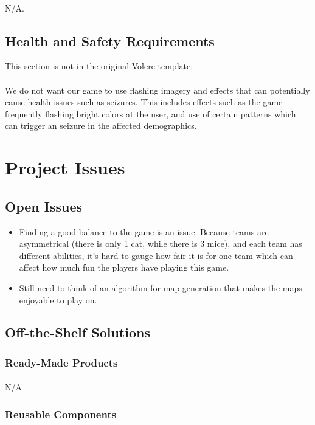 \documentclass[12pt, titlepage]{article}
\begin{document}
\paragraph{}N/A.
\subsection{Health and Safety Requirements}
This section is not in the original Volere template.
\paragraph{}We do not want our game to use flashing imagery and effects that can potentially cause health issues such as seizures. This includes effects such as the game frequently flashing bright colors at the user, and use of certain patterns which can trigger an seizure in the affected demographics.
\section{Project Issues}
\subsection{Open Issues}
\begin{itemize}
    \item Finding a good balance to the game is an issue. Because teams are asymmetrical (there is only 1 cat, while there is 3 mice), and each team has different abilities, it's hard to gauge how fair it is for one team which can affect how much fun the players have playing this game. 
    \item Still need to think of an algorithm for map generation that makes the maps enjoyable to play on. 
\end{itemize}
\subsection{Off-the-Shelf Solutions}
\subsubsection{Ready-Made Products}
\paragraph{}N/A
\subsubsection{Reusable Components}
\end{document}

